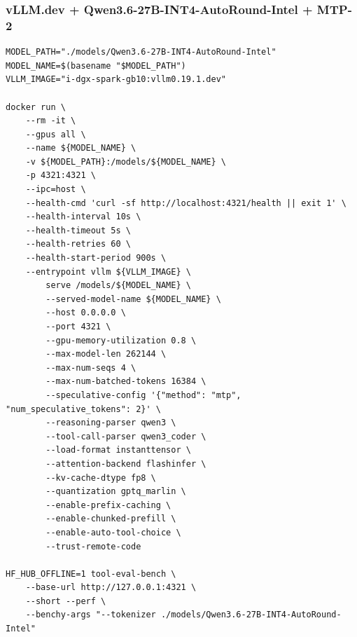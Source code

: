 \documentclass{article}
\begin{document}
\subsubsection{vLLM.dev + Qwen3.6-27B-INT4-AutoRound-Intel + MTP-2}
\begin{lstlisting}
MODEL_PATH="./models/Qwen3.6-27B-INT4-AutoRound-Intel"
MODEL_NAME=$(basename "$MODEL_PATH")
VLLM_IMAGE="i-dgx-spark-gb10:vllm0.19.1.dev"

docker run \
    --rm -it \
    --gpus all \
    --name ${MODEL_NAME} \
    -v ${MODEL_PATH}:/models/${MODEL_NAME} \
    -p 4321:4321 \
    --ipc=host \
    --health-cmd 'curl -sf http://localhost:4321/health || exit 1' \
    --health-interval 10s \
    --health-timeout 5s \
    --health-retries 60 \
    --health-start-period 900s \
    --entrypoint vllm ${VLLM_IMAGE} \
        serve /models/${MODEL_NAME} \
        --served-model-name ${MODEL_NAME} \
        --host 0.0.0.0 \
        --port 4321 \
        --gpu-memory-utilization 0.8 \
        --max-model-len 262144 \
        --max-num-seqs 4 \
        --max-num-batched-tokens 16384 \
        --speculative-config '{"method": "mtp", "num_speculative_tokens": 2}' \
        --reasoning-parser qwen3 \
        --tool-call-parser qwen3_coder \
        --load-format instanttensor \
        --attention-backend flashinfer \
        --kv-cache-dtype fp8 \
        --quantization gptq_marlin \
        --enable-prefix-caching \
        --enable-chunked-prefill \
        --enable-auto-tool-choice \
        --trust-remote-code

HF_HUB_OFFLINE=1 tool-eval-bench \
    --base-url http://127.0.0.1:4321 \
    --short --perf \
    --benchy-args "--tokenizer ./models/Qwen3.6-27B-INT4-AutoRound-Intel"
\end{lstlisting}
\end{document}
